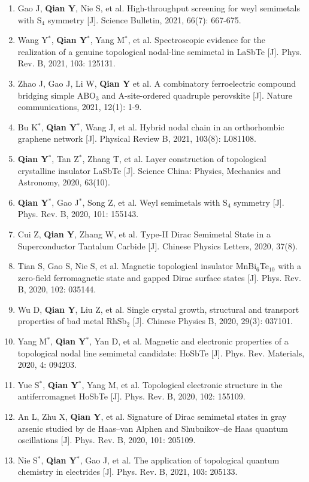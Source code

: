 {
\setlist[enumerate]{}%
\begin{enumerate}[nosep]
    \item Gao J, \textbf{Qian Y}, Nie S, et al. High-throughput screening for weyl semimetals with S$_4$ symmetry [J]. Science Bulletin, 2021, 66(7): 667-675.
    \item Wang Y$^*$, \textbf{Qian Y}$^*$, Yang M$^*$, et al. Spectroscopic evidence for the realization of a genuine topological nodal-line semimetal in LaSbTe [J]. Phys. Rev. B, 2021, 103: 125131.
    \item Zhao J, Gao J, Li W, \textbf{Qian Y} et al. A combinatory ferroelectric compound bridging simple ABO$_3$ and A-site-ordered quadruple perovskite [J]. Nature communications, 2021, 12(1): 1-9.
    \item Bu K$^*$, \textbf{Qian Y}$^*$, Wang J, et al. Hybrid nodal chain in an orthorhombic graphene network [J]. Physical Review B, 2021, 103(8): L081108.

    \item \textbf{Qian Y}$^*$, Tan Z$^*$, Zhang T, et al. Layer construction of topological crystalline insulator LaSbTe [J]. Science China: Physics, Mechanics and Astronomy, 2020, 63(10).
    \item \textbf{Qian Y}$^*$, Gao J$^*$, Song Z, et al. Weyl semimetals with S$_4$ symmetry [J]. Phys. Rev. B, 2020, 101: 155143.
    \item Cui Z, \textbf{Qian Y}, Zhang W, et al. Type-II Dirac Semimetal State in a Superconductor Tantalum Carbide [J]. Chinese Physics Letters, 2020, 37(8).
    \item Tian S, Gao S, Nie S, et al. Magnetic topological insulator MnBi$_6$Te$_{10}$ with a zero-field ferromagnetic state and gapped Dirac surface states [J]. Phys. Rev. B, 2020, 102: 035144.
    \item Wu D, \textbf{Qian Y}, Liu Z, et al. Single crystal growth, structural and transport properties of bad metal RhSb$_2$ [J]. Chinese Physics B, 2020, 29(3): 037101.
    \item Yang M$^*$, \textbf{Qian Y}$^*$, Yan D, et al. Magnetic and electronic properties of a topological nodal line semimetal candidate: HoSbTe [J]. Phys. Rev. Materials, 2020, 4: 094203.
    \item Yue S$^*$, \textbf{Qian Y}$^*$, Yang M, et al. Topological electronic structure in the antiferromagnet HoSbTe [J]. Phys. Rev. B, 2020, 102: 155109.
    \item An L, Zhu X, \textbf{Qian Y}, et al. Signature of Dirac semimetal states in gray arsenic studied by de Haas–van Alphen and Shubnikov–de Haas quantum oscillations [J]. Phys. Rev. B, 2020, 101: 205109.
    \item Nie S$^*$, \textbf{Qian Y}$^*$, Gao J, et al. The application of topological quantum chemistry in electrides [J]. Phys. Rev. B, 2021,  103: 205133.


\end{enumerate}}
